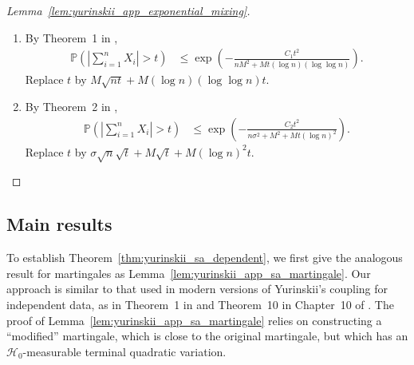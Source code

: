 \documentclass[11pt,lof]{puthesis}
\renewcommand{\P}{\ensuremath{\mathbb{P}}}
\newcommand{\cH}{\ensuremath{\mathcal{H}}}
\theoremstyle{break}
\theoremstyle{proof}
\newtheorem{proof}{Proof}
\begin{document}
\begin{proof}[Lemma~\ref{lem:yurinskii_app_exponential_mixing}]

  \begin{enumerate}[label=(\roman*)]

    \item
      By Theorem~1 in \citet{merlevede2009bernstein},
      \begin{align*}
        \P\left(
          \left|
            \sum_{i=1}^n
            X_i
          \right|
          > t
        \right)
        &\leq
        \exp\left(
          -\frac{C_1 t^2}{n M^2 + Mt (\log n)(\log\log n)}
        \right).
      \end{align*}
      Replace $t$ by
      $M \sqrt{n t} + M (\log n)(\log \log n) t$.

    \item
      By Theorem~2 in \citet{merlevede2009bernstein},
      \begin{align*}
        \P\left(
          \left|
            \sum_{i=1}^n
            X_i
          \right|
          > t
        \right)
        &\leq
        \exp\left(
          -\frac{C_2 t^2}{n\sigma^2 + M^2 + Mt (\log n)^2}
        \right).
      \end{align*}
      Replace $t$ by
      $\sigma \sqrt n \sqrt t + M \sqrt t + M (\log n)^2 t$.
  \end{enumerate}
\end{proof}

\subsection{Main results}

To establish Theorem~\ref{thm:yurinskii_sa_dependent}, we first
give the analogous result
for martingales as Lemma~\ref{lem:yurinskii_app_sa_martingale}. Our approach is
similar to
that used in modern versions of Yurinskii's coupling for independent data, as
in Theorem~1 in \citet{lecam1988} and Theorem~10 in Chapter~10 of
\citet{pollard2002user}. The proof of
Lemma~\ref{lem:yurinskii_app_sa_martingale} relies on
constructing a ``modified'' martingale, which is close to the original
martingale, but which has an $\cH_0$-measurable terminal quadratic variation.
\end{document}
